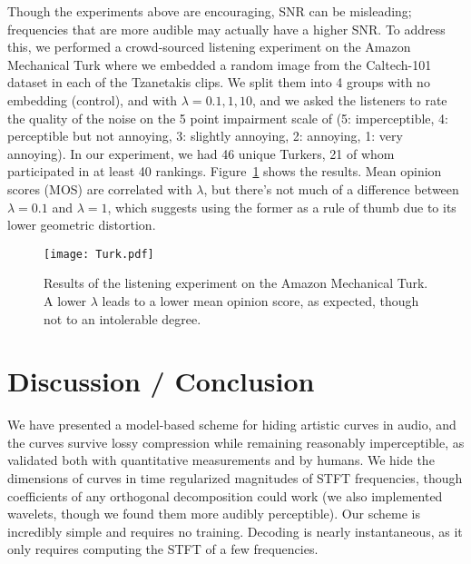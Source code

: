 \documentclass[runningheads]{llncs}
\begin{document}
Though the experiments above are encouraging, SNR can be misleading; frequencies that are more audible may actually have a higher SNR.  To address this, we performed a crowd-sourced listening experiment on the Amazon Mechanical Turk where we embedded a random image from the Caltech-101 dataset in each of the Tzanetakis clips.  We split them into 4 groups with no embedding (control), and with $\lambda = 0.1, 1, 10$, and we asked the listeners to rate the quality of the noise on the 5 point impairment scale of \cite{bassia2001robust} (5: imperceptible, 4: perceptible but not annoying, 3: slightly annoying, 2: annoying, 1: very annoying).  In our experiment, we had 46 unique Turkers, 21 of whom participated in at least 40 rankings.  Figure~\ref{fig:TurkResults} shows the results.  Mean opinion scores (MOS) are correlated with $\lambda$, but there's not much of a difference between $\lambda=0.1$ and $\lambda=1$, which suggests using the former as a rule of thumb due to its lower geometric distortion.




\begin{figure}
  \begin{minipage}[c]{0.36\textwidth}
    \caption{
      Results of the listening experiment on the Amazon Mechanical Turk.  A lower $\lambda$ leads to a lower mean opinion score, as expected, though not to an intolerable degree.
    } \label{fig:TurkResults}
  \end{minipage}
  \begin{minipage}[c]{0.64\textwidth}
    \texttt{[image: Turk.pdf]}
  \end{minipage}\hfill
  
\end{figure}

\section{Discussion / Conclusion}

We have presented a model-based scheme for hiding artistic curves in audio, and the curves survive lossy compression while remaining reasonably imperceptible, as validated both with quantitative measurements and by humans.  We hide the dimensions of curves in time regularized magnitudes of STFT frequencies, though coefficients of any orthogonal decomposition could work (we also implemented wavelets, though we found them more audibly perceptible).  Our scheme is incredibly simple and requires no training.  Decoding is nearly instantaneous, as it only requires computing the STFT of a few frequencies.  



%
%
%


%
\end{document}
